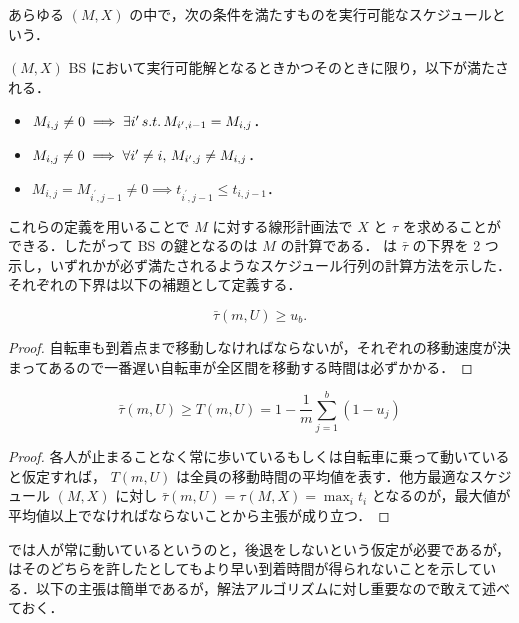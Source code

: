 あらゆる $(M, X)$ の中で，次の条件を満たすものを実行可能なスケジュールという．

\begin{definition}\label{definition:bs-feasible-schedule}
  $(M, X)$ BS において実行可能解となるときかつそのときに限り，以下が満たされる．
  \begin{itemize}
  \item $M_{i, j} \neq 0 \implies \exists i^\prime \,s.t.\, M_{i^\prime, i - 1} = M_{i, j}$．
  \item $M_{i, j} \neq 0 \implies \forall i^\prime \neq i ,\, M_{i^\prime, j} \neq M_{i, j}$．
  \item $M_{i, j} = M_{i^\prime, j - 1} \neq 0 \implies t_{i^\prime,j-1} \leq t_{i,j-1}$．
  \end{itemize}
\end{definition}

これらの定義を用いることで $M$ に対する線形計画法で $X$ と $\tau$ を求めることができる．したがって BS の鍵となるのは $M$ の計算である． \textcite{czyzowicz} は $\bar\tau$ の下界を 2 つ示し，いずれかが必ず満たされるようなスケジュール行列の計算方法を示した．それぞれの下界は以下の補題として定義する．

\begin{lemma}
  \begin{equation}
    \bar\tau(m, U) \geq u_b.
  \end{equation}
\end{lemma}
\begin{proof}
  自転車も到着点まで移動しなければならないが，それぞれの移動速度が決まってあるので一番遅い自転車が全区間を移動する時間は必ずかかる．
\end{proof}

\begin{lemma}\label{lemma:lower-bound-bs}
  \begin{equation}
    \bar\tau(m, U) \geq T(m, U) = 1 - \frac{1}{m}\sum_{j = 1}^b(1 - u_j)
  \end{equation}
\end{lemma}
\begin{proof}
  各人が止まることなく常に歩いているもしくは自転車に乗って動いていると仮定すれば， $T(m, U)$ は全員の移動時間の平均値を表す．他方最適なスケジュール $(M, X)$ に対し $\bar\tau(m, U) = \tau(M, X) = \max_i t_i$ となるのが，最大値が平均値以上でなければならないことから主張が成り立つ．
\end{proof}
 では人が常に動いているというのと，後退をしないという仮定が必要であるが，\textcite{czyzowicz} はそのどちらを許したとしてもより早い到着時間が得られないことを示している．以下の主張は簡単であるが，解法アルゴリズムに対し重要なので敢えて述べておく．

